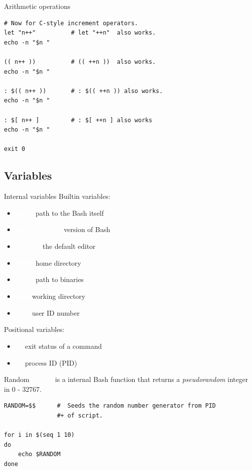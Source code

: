 \documentclass[xcolor=dvipsnames, 10pt, presentation,aspectratio=169]{beamer}
\newcommand{\bashcmd}[1]{\textcolor{White}{\colorbox{Sepia}{\texttt{#1}}}}
\begin{document}
\begin{frame}[label={sec:org0a7df23},fragile]{Arithmetic operations}
 \begin{block}{}
\begin{verbatim}
# Now for C-style increment operators.
let "n++"          # let "++n"  also works.
echo -n "$n "

(( n++ ))          # (( ++n ))  also works.
echo -n "$n "

: $(( n++ ))       # : $(( ++n )) also works.
echo -n "$n "

: $[ n++ ]         # : $[ ++n ] also works
echo -n "$n "

exit 0
\end{verbatim}
\end{block}
\end{frame}
\subsection{Variables}
\label{sec:orgadc84a1}
\begin{frame}[label={sec:orgcc303ab}]{Internal variables}
Builtin variables:
\begin{itemize}
\item \bashcmd{\$BASH} path to the Bash itself
\item \bashcmd{\$BASH\_VERSION} version of Bash
\item \bashcmd{\$EDITOR} the default editor
\item \bashcmd{\$HOME} home directory
\item \bashcmd{\$PATH} path to binaries
\item \bashcmd{\$PWD} working directory
\item \bashcmd{\$UID} user ID number
\end{itemize}
Positional variables:
\begin{itemize}
\item \bashcmd{\$?} exit status  of a command
\item \bashcmd{\$\$} process ID (PID)
\end{itemize}
\end{frame}
\begin{frame}[label={sec:orgb441af1},fragile]{Random}
 \bashcmd{RANDOM} is a internal Bash function that returns a
\emph{pseudorandom} integer in 0 - 32767.
\begin{block}{}
\begin{verbatim}
RANDOM=$$      #  Seeds the random number generator from PID
               #+ of script.

for i in $(seq 1 10)
do
    echo $RANDOM
done
\end{verbatim}
\end{block}
\end{frame}
\end{document}
